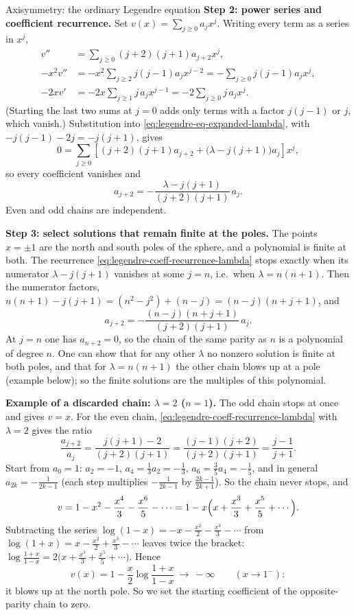 \documentclass[11pt]{beamer}
\begin{document}
\begin{frame}[allowframebreaks=1.00]{Axisymmetry: the ordinary Legendre equation}
\textbf{Step 2: power series and coefficient recurrence.}  Set $v(x)=\sum_{j\ge0}a_jx^j$.
Writing every term as a series in $x^j$,
\begin{align*}
  v''
   &=\sum_{j\ge0}(j+2)(j+1)a_{j+2}x^j,\\
  -x^2v''
   &=-x^2\sum_{j\ge2}j(j-1)a_jx^{j-2}
    =-\sum_{j\ge0}j(j-1)a_jx^j,\\
  -2xv'
   &=-2x\sum_{j\ge1}j\,a_jx^{j-1}
    =-2\sum_{j\ge0}j\,a_jx^j.
\end{align*}
(Starting the last two sums at $j=0$ adds only terms with a factor $j(j-1)$ or $j$, which vanish.)
Substitution into \eqref{eq:legendre-eq-expanded-lambda}, with $-j(j-1)-2j=-j(j+1)$, gives
\[
  0=\sum_{j\ge0}
    \left[
      (j+2)(j+1)a_{j+2}
      +\bigl(\lambda-j(j+1)\bigr)a_j
    \right]x^j,
\]
so every coefficient vanishes and
\begin{equation}
  a_{j+2}
   =-\frac{\lambda-j(j+1)}{(j+2)(j+1)}\,a_j.
  \label{eq:legendre-coeff-recurrence-lambda}
\end{equation}
Even and odd chains are independent.

\textbf{Step 3: select solutions that remain finite at the poles.}
The points $x=\pm1$ are the north and south poles of the sphere, and a polynomial is
finite at both. The recurrence \eqref{eq:legendre-coeff-recurrence-lambda} stops exactly
when its numerator $\lambda-j(j+1)$ vanishes at some $j=n$, i.e.\ when $\lambda=n(n+1)$.
Then the numerator factors,
$n(n+1)-j(j+1)=(n^2-j^2)+(n-j)=(n-j)(n+j+1)$, and
\begin{equation}
  a_{j+2}
   =-\frac{(n-j)(n+j+1)}{(j+2)(j+1)}\,a_j.
  \label{eq:legendre-coeff-recurrence}
\end{equation}
At $j=n$ one has $a_{n+2}=0$, so the chain of the same parity as $n$ is a polynomial of
degree $n$. One can show that for any other $\lambda$ no nonzero solution is finite at both
poles, and that for $\lambda=n(n+1)$ the other chain blows up at a pole (example below); so the
finite solutions are the multiples of this polynomial.



\textbf{Example of a discarded chain: \(\lambda=2\) (\(n=1\)).} The odd chain stops at once and gives \(v=x\).
For the even chain, \eqref{eq:legendre-coeff-recurrence-lambda} with \(\lambda=2\) gives the ratio
\[
 \frac{a_{j+2}}{a_j}=\frac{j(j+1)-2}{(j+2)(j+1)}=\frac{(j-1)(j+2)}{(j+2)(j+1)}=\frac{j-1}{j+1}.
\]
Start from \(a_0=1\): \(a_2=-1\), \(a_4=\frac13a_2=-\frac13\), \(a_6=\frac35a_4=-\frac15\), and in general
\(a_{2k}=-\frac1{2k-1}\) (each step multiplies \(-\frac1{2k-1}\) by \(\frac{2k-1}{2k+1}\)). So the chain never stops, and
\[
 v=1-x^2-\frac{x^4}{3}-\frac{x^6}{5}-\cdots=1-x\Bigl(x+\frac{x^3}{3}+\frac{x^5}{5}+\cdots\Bigr).
\]
Subtracting the series \(\log(1-x)=-x-\frac{x^2}2-\frac{x^3}3-\cdots\) from \(\log(1+x)=x-\frac{x^2}2+\frac{x^3}3-\cdots\)
leaves twice the bracket: \(\log\frac{1+x}{1-x}=2\bigl(x+\frac{x^3}3+\frac{x^5}5+\cdots\bigr)\). Hence
\[
 v(x)=1-\frac x2\log\frac{1+x}{1-x}\ \longrightarrow\ -\infty\qquad(x\to1^-):
\]
it blows up at the north pole. So we set the starting coefficient of the opposite-parity chain to zero.


\end{frame}
\end{document}
